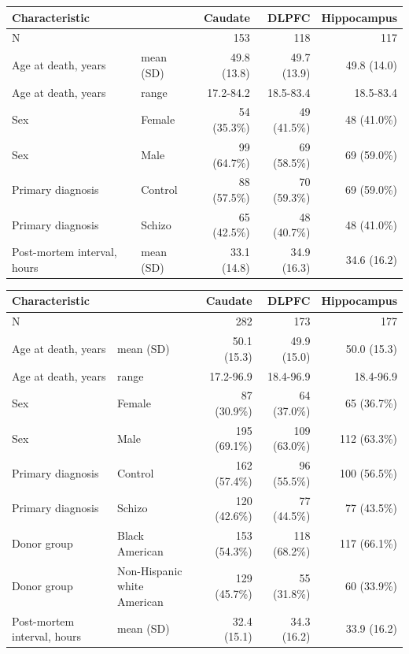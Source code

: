 \begin{tabular}{ll
rrr
}
\toprule
Characteristic &  & Caudate & DLPFC & Hippocampus \\
\midrule
N &  & 153 & 118 & 117 \\
Age at death, years & mean (SD) & 49.8 (13.8) & 49.7 (13.9) & 49.8 (14.0) \\
Age at death, years & range & 17.2-84.2 & 18.5-83.4 & 18.5-83.4 \\
Sex & Female & 54 (35.3\%) & 49 (41.5\%) & 48 (41.0\%) \\
Sex & Male & 99 (64.7\%) & 69 (58.5\%) & 69 (59.0\%) \\
Primary diagnosis & Control & 88 (57.5\%) & 70 (59.3\%) & 69 (59.0\%) \\
Primary diagnosis & Schizo & 65 (42.5\%) & 48 (40.7\%) & 48 (41.0\%) \\
Post-mortem interval, hours & mean (SD) & 33.1 (14.8) & 34.9 (16.3) & 34.6 (16.2) \\
\bottomrule
\end{tabular}

\begin{tabular}{ll
rrr
}
\toprule
Characteristic &  & Caudate & DLPFC & Hippocampus \\
\midrule
N &  & 282 & 173 & 177 \\
Age at death, years & mean (SD) & 50.1 (15.3) & 49.9 (15.0) & 50.0 (15.3) \\
Age at death, years & range & 17.2-96.9 & 18.4-96.9 & 18.4-96.9 \\
Sex & Female & 87 (30.9\%) & 64 (37.0\%) & 65 (36.7\%) \\
Sex & Male & 195 (69.1\%) & 109 (63.0\%) & 112 (63.3\%) \\
Primary diagnosis & Control & 162 (57.4\%) & 96 (55.5\%) & 100 (56.5\%) \\
Primary diagnosis & Schizo & 120 (42.6\%) & 77 (44.5\%) & 77 (43.5\%) \\
Donor group & Black American & 153 (54.3\%) & 118 (68.2\%) & 117 (66.1\%) \\
Donor group & Non-Hispanic white American & 129 (45.7\%) & 55 (31.8\%) & 60 (33.9\%) \\
Post-mortem interval, hours & mean (SD) & 32.4 (15.1) & 34.3 (16.2) & 33.9 (16.2) \\
\bottomrule
\end{tabular}

